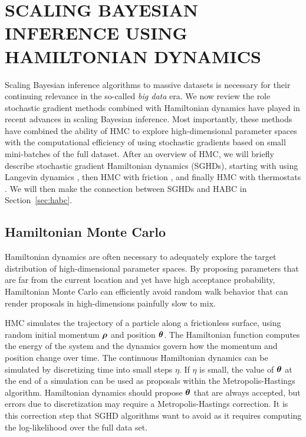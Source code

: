 \documentclass[]{article}
\begin{document}
\section{SCALING BAYESIAN INFERENCE USING HAMILTONIAN DYNAMICS} \label{sec:scaling}
Scaling Bayesian inference algorithms to massive datasets is necessary for their continuing relevance in the so-called {\em big data} era.  We now review the role stochastic gradient methods combined with Hamiltonian dynamics have played in recent advances in scaling Bayesian inference.   Most importantly, these methods have combined the ability of HMC to explore high-dimensional parameter spaces with the computational efficiency of using stochastic gradients based on small mini-batches of the full dataset.  After an overview of HMC, we will briefly describe stochastic gradient Hamiltonian dynamics (SGHDs), starting with using  Langevin dynamics \cite{welling2011bayesian}, then HMC with friction \cite{chen2014stochastic}, and finally HMC with thermostats \cite{ding2014bayesian}.  We will then make the connection between SGHDs and HABC in Section~\ref{sec:habc}.

\subsection{Hamiltonian Monte Carlo}\label{sec:hmc}

Hamiltonian dynamics are often necessary to adequately explore the target distribution of high-dimensional parameter spaces.  By proposing parameters that are far from the current location and yet have high acceptance probability, Hamiltonian Monte Carlo \cite{duane1987hybrid, neal2011mcmc}  can efficiently avoid random walk behavior that can render proposals in high-dimensions painfully slow to mix.

HMC simulates the trajectory of a particle along a frictionless surface, using random initial momentum ${\bm \rho}$ and position ${\bm \theta}$.  The Hamiltonian function computes the energy of the system and the dynamics govern how the momentum and position change over time.  The continuous Hamiltonian dynamics can be simulated by discretizing time into small steps $\eta$.  If $\eta$ is small, the value of ${\bm \theta}$ at the end of a simulation can be used as proposals within the Metropolis-Hastings algorithm.  Hamiltonian dynamics should propose ${\bm \theta}$ that are always accepted, but errors due to discretization may require a  Metropolis-Hastings correction.  It is this correction step that SGHD algorithms want to avoid as it requires computing the log-likelihood over the full data set.
\end{document}
